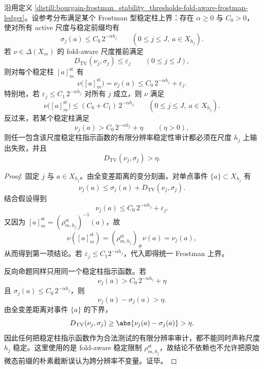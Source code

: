 \begin{proposition}\label{distill:bourgain-frostman_stability_thresholds-scale-stability-forces-no-heavy-ball}
沿用定义 \ref{distill:bourgain-frostman_stability_thresholds-fold-aware-frostman-ledger}。设参考分布满足某个 Frostman 型稳定柱上界：存在 \(\alpha\ge0\) 与 \(C_0>0\)，使对所有 active 尺度与稳定前缀均有
\[
\sigma_j(a)\le C_0\,2^{-\alpha h_j}
\qquad(0\le j\le J,\ a\in X_{h_j}).
\]
若 \(\nu\in\Delta(X_m)\) 的 fold-aware 尺度推前满足
\[
D_{\mathrm{TV}}(\nu_j,\sigma_j)\le \varepsilon_j
\qquad(0\le j\le J),
\]
则对每个稳定柱 \([a]^{\mathrm{st}}_m\) 有
\[
\nu\bigl([a]^{\mathrm{st}}_m\bigr)=\nu_j(a)\le C_0\,2^{-\alpha h_j}+\varepsilon_j.
\]
特别地，若 \(\varepsilon_j\le C_1\,2^{-\alpha h_j}\) 对所有 \(j\) 成立，则 \(\nu\) 满足
\[
\nu\bigl([a]^{\mathrm{st}}_m\bigr)\le (C_0+C_1)\,2^{-\alpha h_j}
\qquad(0\le j\le J,\ a\in X_{h_j}).
\]
反过来，若某个稳定柱满足
\[
\nu_j(a)>C_0\,2^{-\alpha h_j}+\eta
\qquad(\eta>0),
\]
则任一包含该尺度稳定柱指示函数的有限分辨率稳定性审计都必须在尺度 \(h_j\) 上输出失败，并且
\[
D_{\mathrm{TV}}(\nu_j,\sigma_j)>\eta.
\]
\end{proposition}
\begin{proof}
固定 \(j\) 与 \(a\in X_{h_j}\)。由全变差距离的变分刻画，对单点事件 \(\{a\}\subset X_{h_j}\) 有
\[
\nu_j(a)\le \sigma_j(a)+D_{\mathrm{TV}}(\nu_j,\sigma_j).
\]
结合假设得到
\[
\nu_j(a)\le C_0\,2^{-\alpha h_j}+\varepsilon_j.
\]
又因为 \([a]^{\mathrm{st}}_m=(\rho^{\mathrm{st}}_{m,h_j})^{-1}(a)\)，故
\[
\nu([a]^{\mathrm{st}}_m)=(\rho^{\mathrm{st}}_{m,h_j})_\#\nu(a)=\nu_j(a),
\]
从而得到第一项结论。若 \(\varepsilon_j\le C_1 2^{-\alpha h_j}\)，代入即得统一 Frostman 上界。

反向命题同样只用同一个稳定柱指示函数。若
\[
\nu_j(a)>C_0\,2^{-\alpha h_j}+\eta
\]
且 \(\sigma_j(a)\le C_0\,2^{-\alpha h_j}\)，则
\[
\nu_j(a)-\sigma_j(a)>\eta.
\]
由全变差距离对事件 \(\{a\}\) 的下界，
\[
D_{\mathrm{TV}}(\nu_j,\sigma_j)\ge \abs{\nu_j(a)-\sigma_j(a)}>\eta.
\]
因此任何把稳定柱指示函数作为合法测试的有限分辨率审计，都不能同时声称尺度 \(h_j\) 稳定。这里使用的是 fold-aware 稳定限制 \(\rho^{\mathrm{st}}_{m,h_j}\)，故结论不依赖也不允许把原始微态前缀的朴素截断误认为跨分辨率不变量。证毕。
\end{proof}



